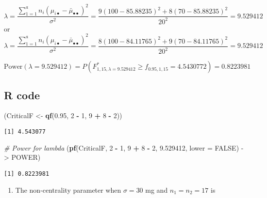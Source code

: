 \documentclass[
]{article}
\newenvironment{Shaded}{\begin{snugshade}}{\end{snugshade}}
\newcommand{\AttributeTok}[1]{\textcolor[rgb]{0.13,0.29,0.53}{#1}}
\newcommand{\CommentTok}[1]{\textcolor[rgb]{0.56,0.35,0.01}{\textit{#1}}}
\newcommand{\ConstantTok}[1]{\textcolor[rgb]{0.56,0.35,0.01}{#1}}
\newcommand{\DecValTok}[1]{\textcolor[rgb]{0.00,0.00,0.81}{#1}}
\newcommand{\FloatTok}[1]{\textcolor[rgb]{0.00,0.00,0.81}{#1}}
\newcommand{\FunctionTok}[1]{\textcolor[rgb]{0.13,0.29,0.53}{\textbf{#1}}}
\newcommand{\NormalTok}[1]{#1}
\newcommand{\OtherTok}[1]{\textcolor[rgb]{0.56,0.35,0.01}{#1}}
\newcommand{\SpecialCharTok}[1]{\textcolor[rgb]{0.81,0.36,0.00}{\textbf{#1}}}
\providecommand{\tightlist}{%
  \setlength{\itemsep}{0pt}\setlength{\parskip}{0pt}}
\begin{document}
\begin{equation*}
\lambda = \frac{\sum_{1 = 1}^an_i(\mu_{i\bullet} - \bar{\mu}_{\bullet\bullet})^2}{\sigma^2} = \frac{9(100 - 85.88235)^2 + 8(70 - 85.88235)^2}{20^2} = 9.529412
\end{equation*}
or
\begin{equation*}
\lambda = \frac{\sum_{1 = 1}^an_i(\mu_{i\bullet} - \bar{\mu}_{\bullet\bullet})^2}{\sigma^2} = \frac{8(100 - 84.11765)^2 + 9(70 - 84.11765)^2}{20^2} = 9.529412
\end{equation*}

\[\text{Power}(\lambda = 9.529412) = P(F^*_{1, 15, \lambda = 9.529412} \geq f_{0.95, 1, 15} = 4.5430772) = 0.8223981\]

\hypertarget{r-code-2}{%
\subsection*{R code}\label{r-code-2}}

\begin{Shaded}
\begin{Highlighting}[]
\NormalTok{(CriticalF }\OtherTok{\textless{}{-}} \FunctionTok{qf}\NormalTok{(}\FloatTok{0.95}\NormalTok{, }\DecValTok{2} \SpecialCharTok{{-}} \DecValTok{1}\NormalTok{, }\DecValTok{9} \SpecialCharTok{+} \DecValTok{8} \SpecialCharTok{{-}} \DecValTok{2}\NormalTok{))}
\end{Highlighting}
\end{Shaded}

\begin{verbatim}
[1] 4.543077
\end{verbatim}

\begin{Shaded}
\begin{Highlighting}[]
\CommentTok{\# Power for lambda}
\NormalTok{(}\FunctionTok{pf}\NormalTok{(CriticalF, }\DecValTok{2} \SpecialCharTok{{-}} \DecValTok{1}\NormalTok{, }\DecValTok{9} \SpecialCharTok{+} \DecValTok{8} \SpecialCharTok{{-}} \DecValTok{2}\NormalTok{, }\FloatTok{9.529412}\NormalTok{, }\AttributeTok{lower =} \ConstantTok{FALSE}\NormalTok{) }\OtherTok{{-}\textgreater{}}\NormalTok{ POWER)}
\end{Highlighting}
\end{Shaded}

\begin{verbatim}
[1] 0.8223981
\end{verbatim}

\begin{enumerate}
\def\labelenumi{\alph{enumi})}
\setcounter{enumi}{5}
\tightlist
\item
  The non-centrality parameter when \(\sigma = 30\) mg and \(n_1 = n_2 = 17\) is
\end{enumerate}
\end{document}
